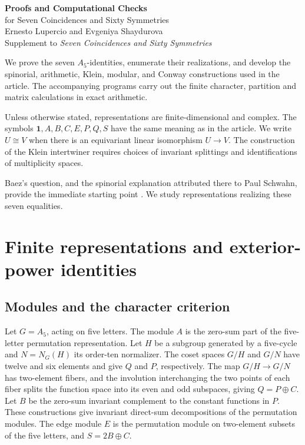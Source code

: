 \documentclass[11pt,a4paper]{article}
\begin{document}
\thispagestyle{plain}
\begin{center}
{\Large\bfseries Proofs and Computational Checks}\\[6pt]
{\large for Seven Coincidences and Sixty Symmetries}\\[6pt]
Ernesto Lupercio and Evgeniya Shaydurova\\[3pt]
{\small Supplement to \emph{Seven Coincidences and Sixty Symmetries}}
\end{center}
\medskip
We prove the seven $A_5$-identities, enumerate their realizations, and develop the spinorial, arithmetic, Klein, modular, and Conway constructions used in the article. The accompanying programs carry out the finite character, partition and matrix calculations in exact arithmetic.

Unless otherwise stated, representations are finite-dimensional and complex. The symbols \(\mathbf1,A,B,C,E,P,Q,S\) have the same meaning as in the article. We write \(U\cong V\) when there is an equivariant linear isomorphism \(U\to V\). The construction of the Klein intertwiner requires choices of invariant splittings and identifications of multiplicity spaces.

Baez's question, and the spinorial explanation attributed there to Paul Schwahn, provide the immediate starting point \citep{Baez2026Coincidences}. We study representations realizing these seven equalities.

\tableofcontents

\clearpage

\appendix
\section{Finite representations and exterior-power identities}\label{sec:finite}

\subsection{Modules and the character criterion}\label{subsec:A1}

Let \(G=A_5\), acting on five letters. The module \(A\) is the zero-sum part of the five-letter permutation representation. Let \(H\) be a subgroup generated by a five-cycle and \(N=N_G(H)\) its order-ten normalizer. The coset spaces \(G/H\) and \(G/N\) have twelve and six elements and give \(Q\) and \(P\), respectively. The map \(G/H\to G/N\) has two-element fibers, and the involution interchanging the two points of each fiber splits the function space into its even and odd subspaces, giving \(Q=P\oplus C\). Let \(B\) be the zero-sum invariant complement to the constant functions in \(P\). These constructions give invariant direct-sum decompositions of the permutation modules. The edge module \(E\) is the permutation module on two-element subsets of the five letters, and \(S=2B\oplus C\).
\end{document}
